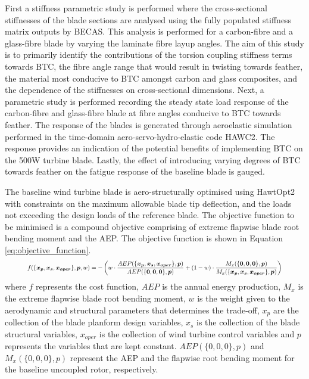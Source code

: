 \documentclass[a4paper]{jpconf}
\begin{document}
First a stiffness parametric study is performed where the cross-sectional stiffnesses of the blade sections are analysed using the fully populated stiffness matrix outputs by BECAS. This analysis is performed for a carbon-fibre and a glass-fibre blade by varying the laminate fibre layup angles. The aim of this study is to primarily identify the contributions of the torsion coupling stiffness terms towards BTC, the fibre angle range that would result in twisting towards feather, the material most conducive to BTC amongst carbon and glass composites, and the dependence of the stiffnesses on cross-sectional dimensions. Next, a parametric study is performed recording the steady state load response of the carbon-fibre and glass-fibre blade at fibre angles conducive to BTC towards feather. The response of the blades is generated through aeroelastic simulation performed in the time-domain aero-servo-hydro-elastic code HAWC2. The response provides an indication of the potential benefits of implementing BTC on the 500W turbine blade. Lastly, the effect of introducing varying degrees of BTC towards feather on the fatigue response of the baseline blade is gauged. 

The baseline wind turbine blade is aero-structurally optimised using HawtOpt2 with constraints on the maximum allowable blade tip deflection, and the loads not exceeding the design loads of the reference blade. The objective function to be minimised is a compound objective comprising of extreme flapwise blade root bending moment and the AEP. The objective function is shown in Equation \ref{eq:objective_function}.
\begin{equation}
\resizebox{.9 \textwidth}{!}{ 
     $ f(\{\bm{x_p}, \bm{x_s}, \bm{x_{oper}}\},\bm{p}, w)= -\left( w \cdot \dfrac{AEP(\{\bm{x_p}, \bm{x_s}, \bm{x_{oper}}\},\bm{p})}{AEP(\{\bm{0},\bm{0},\bm{0}\},\bm{p})} + (1-w) \cdot \dfrac{M_x(\{\bm{0},\bm{0},\bm{0}\},\bm{p})}{M_x(\{\bm{x_p}, \bm{x_s}, \bm{x_{oper}}\},\bm{p})} \right)$
     }
\label{eq:objective_function}
\end{equation}
where $f$ represents the cost function, $AEP$ is the annual energy production, $M_x$ is the extreme flapwise blade root bending moment, $w$ is the weight given to the aerodynamic and structural parameters that determines the trade-off, $x_p$ are the collection of the blade planform design variables, $x_s$ is the collection of the blade structural variables, $x_{oper}$ is the collection of wind turbine control variables and $p$ represents the variables that are kept constant. $AEP(\{0,0,0\},p)$ and $M_x(\{0,0,0\},p)$ represent the AEP and the flapwise root bending moment for the baseline uncoupled rotor, respectively.
\end{document}
